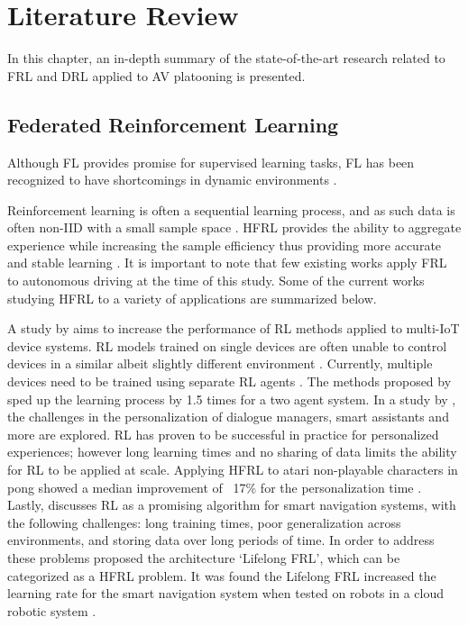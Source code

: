 \chapter{Literature Review} \label{chap:litreview}
In this chapter, an in-depth summary of the state-of-the-art research related to 
FRL and DRL applied to AV platooning is presented. 

\section{Federated Reinforcement Learning}
Although FL provides promise for supervised learning tasks, FL has been recognized to have
shortcomings in dynamic environments \cite{Li2020a}.   

\cite{Zhuo2019}
\cite{Wang2018a}
\cite{Wang2020a}

\cite{Ren2019}

Reinforcement learning is often a sequential learning process, and as such data is often 
non-IID with a small sample space \cite{sutton2018reinforcement}.  HFRL provides the ability 
to aggregate experience while increasing the sample efficiency thus providing more accurate 
and stable learning  \cite{IntelAI19}. It is important to note that few existing works apply 
FRL to autonomous driving at the time of this study.  Some of the current works studying 
HFRL to a variety of applications are summarized below.

A study by \cite{Lim2020} aims to increase the performance of RL methods applied to 
multi-IoT device systems.  RL models trained on single devices are often unable to control 
devices in a similar albeit slightly different environment \cite{Lim2020}.  Currently, 
multiple devices need to be trained using separate RL agents \cite{Lim2020}. The methods 
proposed by \cite{Lim2020} sped up the learning process by 1.5 times for a two agent system. 
In a study by \cite{Nadiger2019}, the challenges in the personalization of dialogue 
managers, smart assistants and more are explored.  RL has proven to be successful in 
practice for personalized experiences; however long learning times and no sharing of data 
limits the ability for RL to be applied at scale.  Applying HFRL to atari non-playable 
characters in pong showed a median improvement of ~17\% for the personalization time 
\cite{Nadiger2019}. Lastly, \cite{Liu2019b} discusses RL as a promising algorithm for 
smart navigation systems, with the following challenges: long training times, poor 
generalization across environments, and storing data over long periods of time.  In order 
to address these problems \cite{Liu2019b} proposed the architecture `Lifelong FRL', 
which can be categorized as a HFRL problem.  It was found the Lifelong FRL increased 
the learning rate for the smart navigation system when tested on robots in a cloud 
robotic system \cite{Liu2019b}.  


